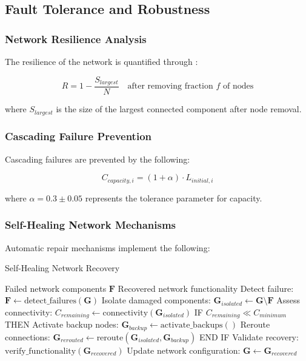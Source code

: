 \documentclass[12pt,a4paper]{article}
\begin{document}
\subsection{Fault Tolerance and Robustness}

\subsubsection{Network Resilience Analysis}

The resilience of the network is quantified through \cite{albert2000error}:

\begin{equation}
R = 1 - \frac{S_{largest}}{N} \quad \text{after removing fraction } f \text{ of nodes}
\end{equation}

where $S_{largest}$ is the size of the largest connected component after node removal.

\subsubsection{Cascading Failure Prevention}

Cascading failures are prevented by the following:

\begin{equation}
C_{capacity,i} = (1 + \alpha) \cdot L_{initial,i}
\end{equation}

where $\alpha = 0.3 \pm 0.05$ represents the tolerance parameter for capacity.

\subsubsection{Self-Healing Network Mechanisms}

Automatic repair mechanisms implement the following:

\begin{algorithm}[H]
\caption{Self-Healing Network Recovery}
\begin{algorithmic}[1]
\REQUIRE Failed network components $\mathbf{F}$
\ENSURE Recovered network functionality
\STATE Detect failure: $\mathbf{F} \leftarrow \text{detect\_failures}(\mathbf{G})$
\STATE Isolate damaged components: $\mathbf{G}_{isolated} \leftarrow \mathbf{G} \setminus \mathbf{F}$
\STATE Assess connectivity: $C_{remaining} \leftarrow \text{connectivity}(\mathbf{G}_{isolated})$
\STATE IF $C_{remaining} \ll C_{minimum}$ THEN
\STATE \quad Activate backup nodes: $\mathbf{G}_{backup} \leftarrow \text{activate\_backups}()$
\STATE \quad Reroute connections: $\mathbf{G}_{rerouted} \leftarrow \text{reroute}(\mathbf{G}_{isolated}, \mathbf{G}_{backup})$
\STATE END IF
\STATE Validate recovery: $\text{verify\_functionality}(\mathbf{G}_{recovered})$
\STATE Update network configuration: $\mathbf{G} \leftarrow \mathbf{G}_{recovered}$
\end{algorithmic}
\end{algorithm}
\end{document}
